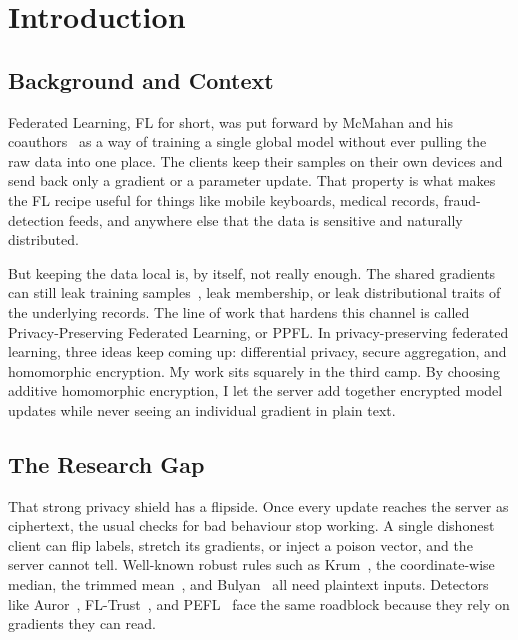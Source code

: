 \chapter{Introduction}
\label{Intro:chap:chap1}
\graphicspath{{10.Chapter1/Images/}}

\section{Background and Context}

Federated Learning, FL for short, was put forward by McMahan and his coauthors~\cite{mcmahan2017communication} as a way of training a single global model without ever pulling the raw data into one place. The clients keep their samples on their own devices and send back only a gradient or a parameter update. That property is what makes the FL recipe useful for things like mobile keyboards, medical records, fraud-detection feeds, and anywhere else that the data is sensitive and naturally distributed.

But keeping the data local is, by itself, not really enough. The shared gradients can still leak training samples~\cite{zhu2019deep}, leak membership, or leak distributional traits of the underlying records. The line of work that hardens this channel is called Privacy-Preserving Federated Learning, or PPFL. In privacy-preserving federated learning, three ideas keep coming up: differential privacy, secure aggregation, and homomorphic encryption. My work sits squarely in the third camp. By choosing additive homomorphic encryption, I let the server add together encrypted model updates while never seeing an individual gradient in plain text.

\section{The Research Gap}

That strong privacy shield has a flipside. Once every update reaches the server as ciphertext, the usual checks for bad behaviour stop working. A single dishonest client can flip labels, stretch its gradients, or inject a poison vector, and the server cannot tell. Well-known robust rules such as Krum~\cite{blanchard2017machine}, the coordinate-wise median, the trimmed mean~\cite{yin2018byzantine}, and Bulyan~\cite{guerraoui2018hidden} all need plaintext inputs. Detectors like Auror~\cite{shen2016auror}, FL-Trust~\cite{cao2021fltrust}, and PEFL~\cite{liu2021privacy} face the same roadblock because they rely on gradients they can read.

